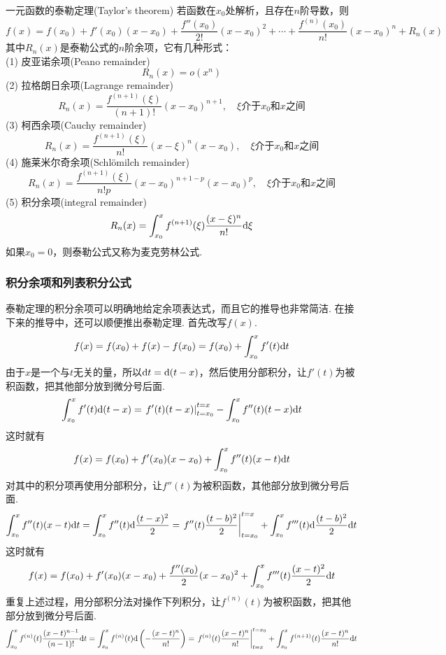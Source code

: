\documentclass[main.tex]{subfiles}
\begin{document}
\begin{theorem}{一元函数的泰勒定理(Taylor's theorem)}
    若函数在\(x_0\)处解析，且存在\(n\)阶导数，则
    \[f(x) = f(x_0)+f'(x_0)(x-x_0)+\frac{f''(x_0)}{2!}(x-x_0)^2+\cdots+\frac{f^{(n)}(x_0)}{n!}(x-x_0)^n+R_n(x)\]
    其中\(R_n(x)\)是泰勒公式的\(n\)阶余项，它有几种形式：\\
    (1) 皮亚诺余项(Peano remainder)
    \[ R_n(x) = o(x^n) \]
    (2) 拉格朗日余项(Lagrange remainder)
    \[ R_n(x) = \frac{f^{(n+1)}(\xi)}{(n+1)!}(x-x_0)^{n+1}, \quad \xi\mbox{介于}x_0\mbox{和}x\mbox{之间}\]
    (3) 柯西余项(Cauchy remainder)
    \[ R_n(x) = \frac{f^{(n+1)}(\xi)}{n!}(x-\xi)^{n}(x-x_0), \quad \xi\mbox{介于}x_0\mbox{和}x\mbox{之间}\]
    (4) 施莱米尔奇余项(Schlömilch remainder)
    \[ R_n(x) = \frac{f^{(n+1)}(\xi)}{n!p}(x-x_0)^{n+1-p}(x-x_0)^p, \quad \xi\mbox{介于}x_0\mbox{和}x\mbox{之间}\]
    (5) 积分余项(integral remainder)
    \[ R_n(x) = \int_{x_0}^{x}f^{(n+1)}(\xi)\frac{(x-\xi)^{n}}{n!}{\rm d}{\xi} \]
    如果\(x_0=0\)，则泰勒公式又称为麦克劳林公式.
\end{theorem}

\subsubsection{积分余项和列表积分公式}

泰勒定理的积分余项可以明确地给定余项表达式，而且它的推导也非常简洁. 在接下来的推导中，还可以顺便推出泰勒定理. 首先改写\(f(x)\).
\[f(x)=f(x_0)+f(x)-f(x_0)=f(x_0)+\int_{x_0}^{x}f'(t){\rm d}t\]
由于\(x\)是一个与\(t\)无关的量，所以\({\rm d}t={\rm d}(t-x)\)，然后使用分部积分，让\(f'(t)\)为被积函数，把其他部分放到微分号后面.
\[\int_{x_0}^{x}f'(t){\rm d}(t-x) = \left.f'(t)(t-x)\right|_{t=x_0}^{t=x} - \int_{x_0}^{x}f''(t)(t-x){\rm d}t\]
这时就有
\[f(x) = f(x_0)+f'(x_0)(x-x_0)+\int_{x_0}^{x}f''(t)(x-t){\rm d}t\]
对其中的积分项再使用分部积分，让\(f''(t)\)为被积函数，其他部分放到微分号后面.
\[\int_{x_0}^{x}f''(t)(x-t){\rm d}t = \int_{x_0}^{x}f''(t){\rm d}\frac{(t-x)^2}{2} = \left.f''(t)\frac{(t-b)^2}{2}\right|_{t=x_0}^{t=x} + \int_{x_0}^{x}f'''(t){\rm d}\frac{(t-b)^2}{2}{\rm d}t\]
这时就有
\[f(x) = f(x_0)+f'(x_0)(x-x_0)+\frac{f''(x_0)}{2}(x-x_0)^2+\int_{x_0}^{x}f'''(t)\frac{(x-t)^2}{2}{\rm d}t\]
重复上述过程，用分部积分法对操作下列积分，让\(f^{(n)}(t)\)为被积函数，把其他部分放到微分号后面.
\[\int_{x_0}^{x}f^{(n)}(t)\frac{(x-t)^{n-1}}{(n-1)!}{\rm d}t = \int_{x_0}^{x}f^{(n)}(t){\rm d}\left(-\frac{(x-t)^n}{n!}\right) = \left.f^{(n)}(t)\frac{(x-t)^n}{n!}\right|_{t=x}^{t=x_0} + \int_{x_0}^{x}f^{(n+1)}(t)\frac{(x-t)^{n}}{n!}{\rm d}t\]
\end{document}
